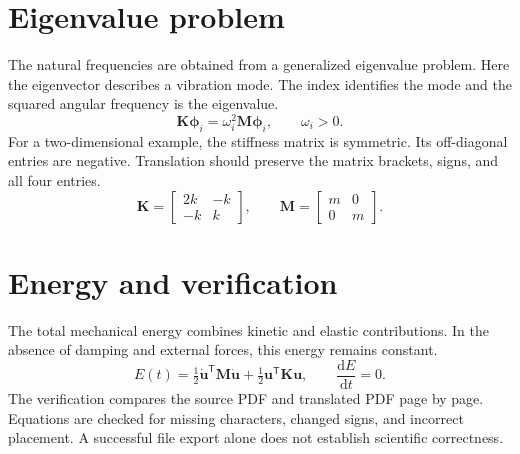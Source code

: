 \documentclass[11pt,a4paper]{article}
\begin{document}
\section{Eigenvalue problem}
The natural frequencies are obtained from a generalized eigenvalue problem. Here the eigenvector describes a vibration mode. The index identifies the mode and the squared angular frequency is the eigenvalue.
\begin{equation}
\mathbf{K}\boldsymbol{\phi}_i=\omega_i^2\mathbf{M}\boldsymbol{\phi}_i,
\qquad \omega_i>0.
\end{equation}
For a two-dimensional example, the stiffness matrix is symmetric. Its off-diagonal entries are negative. Translation should preserve the matrix brackets, signs, and all four entries.
\begin{equation}
\mathbf{K}=\begin{bmatrix}2k&-k\\-k&k\end{bmatrix},\qquad
\mathbf{M}=\begin{bmatrix}m&0\\0&m\end{bmatrix}.
\end{equation}
\section{Energy and verification}
The total mechanical energy combines kinetic and elastic contributions. In the absence of damping and external forces, this energy remains constant.
\begin{equation}
E(t)=\tfrac12\dot{\mathbf{u}}^{\mathsf{T}}\mathbf{M}\dot{\mathbf{u}}
+\tfrac12\mathbf{u}^{\mathsf{T}}\mathbf{K}\mathbf{u},\qquad \frac{\mathrm{d}E}{\mathrm{d}t}=0.
\end{equation}
The verification compares the source PDF and translated PDF page by page. Equations are checked for missing characters, changed signs, and incorrect placement. A successful file export alone does not establish scientific correctness.
\end{document}

